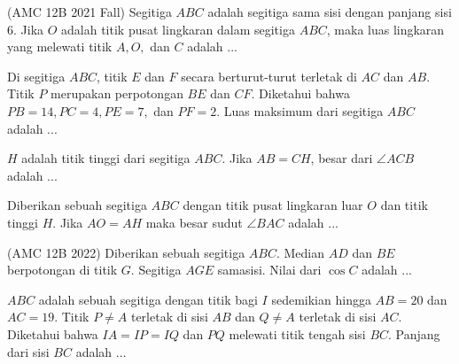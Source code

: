 \documentclass[11pt]{scrartcl}
\begin{document}
\begin{problem}
    (AMC 12B 2021 Fall) Segitiga $ABC$ adalah segitiga sama sisi dengan panjang sisi $6$. Jika $O$ adalah titik pusat lingkaran dalam segitiga $ABC$, maka luas lingkaran yang melewati titik $A, O,$ dan $C$ adalah ...
\end{problem}

\begin{problem}
    Di segitiga $ABC$, titik $E$ dan $F$ secara berturut-turut terletak di $AC$ dan $AB$. Titik $P$ merupakan perpotongan $BE$ dan $CF$. Diketahui bahwa $PB=14,PC=4,PE=7,$ dan $PF=2$. Luas maksimum dari segitiga $ABC$ adalah ...
\end{problem}

\begin{problem}
    $H$ adalah titik tinggi dari segitiga $ABC$. Jika $AB=CH$, besar dari $\angle{ACB}$ adalah ...
\end{problem}

\begin{problem}
Diberikan sebuah segitiga $ABC$ dengan titik pusat lingkaran luar $O$ dan titik tinggi $H$. Jika $AO = AH$ maka besar sudut $\angle BAC$ adalah ...
\end{problem}

\begin{problem}
    (AMC 12B 2022) Diberikan sebuah segitiga $ABC$. Median $AD$ dan $BE$ berpotongan di titik $G$. Segitiga $AGE$ samasisi. Nilai dari $\cos{C}$ adalah ...
\end{problem}

\begin{problem}
    $ABC$ adalah sebuah segitiga dengan titik bagi $I$ sedemikian hingga $AB=20$ dan $AC=19$. Titik $P\neq A$ terletak di sisi $AB$ dan $Q\neq A$ terletak di sisi $AC$. Diketahui bahwa $IA=IP=IQ$ dan $PQ$ melewati titik tengah sisi $BC$. Panjang dari sisi $BC$ adalah ...
\end{problem}
\end{document}
